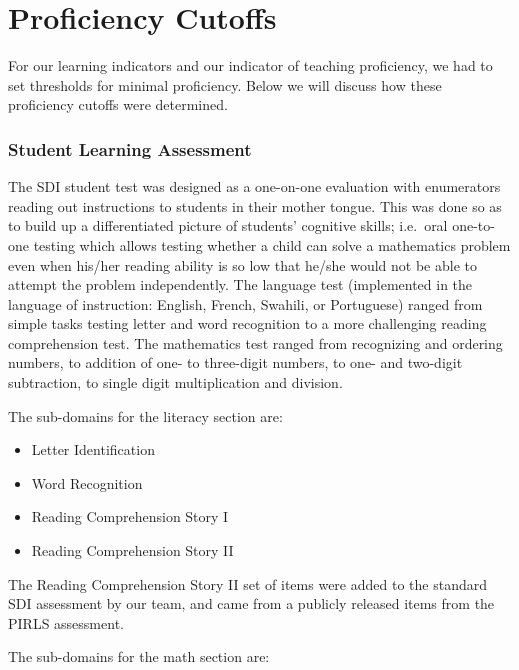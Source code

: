 \documentclass[]{article}
\providecommand{\tightlist}{%
  \setlength{\itemsep}{0pt}\setlength{\parskip}{0pt}}
\begin{document}
\hypertarget{proficiency-cutoffs}{%
\section{Proficiency Cutoffs}\label{proficiency-cutoffs}}

For our learning indicators and our indicator of teaching proficiency,
we had to set thresholds for minimal proficiency. Below we will discuss
how these proficiency cutoffs were determined.

\hypertarget{student-learning-assessment}{%
\subsubsection{Student Learning
Assessment}\label{student-learning-assessment}}

The SDI student test was designed as a one-on-one evaluation with
enumerators reading out instructions to students in their mother tongue.
This was done so as to build up a differentiated picture of students'
cognitive skills; i.e.~oral one-to-one testing which allows testing
whether a child can solve a mathematics problem even when his/her
reading ability is so low that he/she would not be able to attempt the
problem independently. The language test (implemented in the language of
instruction: English, French, Swahili, or Portuguese) ranged from simple
tasks testing letter and word recognition to a more challenging reading
comprehension test. The mathematics test ranged from recognizing and
ordering numbers, to addition of one- to three-digit numbers, to one-
and two-digit subtraction, to single digit multiplication and division.

The sub-domains for the literacy section are:

\begin{itemize}
\tightlist
\item
  Letter Identification
\item
  Word Recognition
\item
  Reading Comprehension Story I\\
\item
  Reading Comprehension Story II
\end{itemize}

The Reading Comprehension Story II set of items were added to the
standard SDI assessment by our team, and came from a publicly released
items from the PIRLS assessment.

The sub-domains for the math section are:
\end{document}
